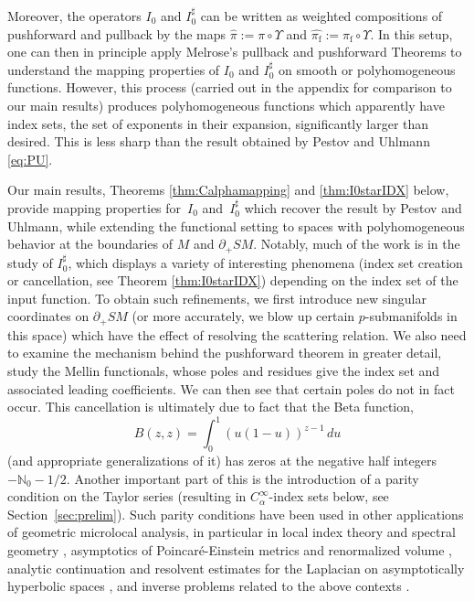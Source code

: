 \documentclass[JEP,XML,SOM,Unicode,NoFloatCountersInSection, NoEqCountersInSection,published]{cedram}
\theoremstyle{plain}
\theoremstyle{definition}
\theoremstyle{remark}
\def\Nm{{\mathbb{N}}}
\newcommand{\adj}{I_0^\sharp}
\newcommand{\hpi}{\widehat{\pi}}
\newcommand{\foot}{{\pi_{\mathrm f}}}
\newcommand{\hF}{\widehat{\foot}}
\begin{document}
Moreover, the operators $I_0$ and $\adj$ can be written as weighted compositions of pushforward and pullback by the maps $\hpi:= \pi\circ\Upsilon$ and $\hF:= \foot\circ\Upsilon$. In this setup, one can then in principle apply Melrose's pullback and pushforward Theorems to understand the mapping properties of $I_0$ and $\adj$ on smooth or polyhomogeneous functions. However, this process (carried out in the appendix for comparison to our main results) produces polyhomogeneous functions which apparently have index sets, \ie the set of exponents in their expansion, significantly larger than desired. This is less sharp than the result obtained by Pestov and Uhlmann \eqref{eq:PU}.

Our main results, Theorems \ref{thm:Calphamapping} and \ref{thm:I0starIDX} below, provide mapping properties for~$I_0$ and~$\adj$ which recover the result by Pestov and Uhlmann, while extending the functional setting to spaces with polyhomogeneous behavior at the boundaries of $M$ and $\partial_+ SM$. Notably, much of the work is in the study of $\adj$, which displays a variety of interesting phenomena (\eg index set creation or cancellation, see Theorem \ref{thm:I0starIDX}) depending on the index set of the input function. To obtain such refinements, we first introduce new singular coordinates on $\partial_+ SM$ (or more accurately, we blow up certain $p$-submanifolds in this space) which have the effect of resolving the scattering relation. We also need to examine the mechanism behind the pushforward theorem in greater detail, \ie study the Mellin functionals, whose poles and residues give the index set and associated leading coefficients. We can then see that certain poles do not in fact occur.
This cancellation is ultimately due to fact that the Beta function,
\begin{equation}
B(z,z) = \int_0^1 (u(1-u))^{z-1}\, du
\label{eq:Beta}
\end{equation}
(and appropriate generalizations of it) has zeros at the negative half integers $-\Nm_0-1/2$. Another important part of this is the introduction of a parity condition on the Taylor series (resulting in $C_\alpha^\infty$-index sets below, see Section~\ref{sec:prelim}). Such parity conditions have been used in other applications of geometric microlocal analysis, in particular in local index theory and spectral geometry \cite{Melrose1993,Mazzeo2014}, asymptotics of Poincaré-Einstein metrics \cite{Fefferman1985} and renormalized volume \cite{Albin2009,Bahuaud2019}, analytic continuation and resolvent estimates for the Laplacian on asymptotically hyperbolic spaces \cite{Vasy2013,Vasy2017}, and inverse problems related to the above contexts \cite{MarxKuo2024,Eptaminitakis2021}.
\end{document}
